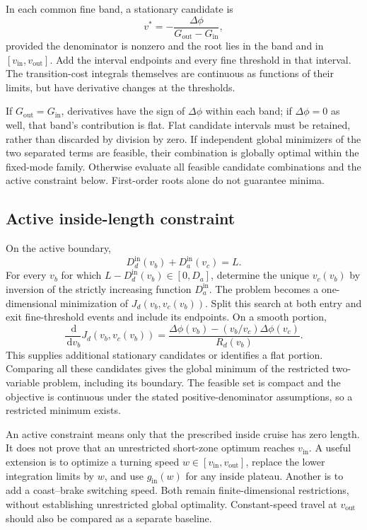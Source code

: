 \documentclass[10pt,a4paper]{article}
\newcommand{\dd}{\,\mathrm{d}}
\newcommand{\out}{\mathrm{out}}
\newcommand{\inn}{\mathrm{in}}
\begin{document}
In each common fine band, a stationary candidate is
\begin{equation}
v^*=-\frac{\Delta\phi}{G_{\out}-G_{\inn}},
\end{equation}
provided the denominator is nonzero and the root lies in the band and in $[v_{\inn},v_{\out}]$. Add the interval endpoints and every fine threshold in that interval. The transition-cost integrals themselves are continuous as functions of their limits, but have derivative changes at the thresholds.

If $G_{\out}=G_{\inn}$, derivatives have the sign of $\Delta\phi$ within each band; if $\Delta\phi=0$ as well, that band's contribution is flat. Flat candidate intervals must be retained, rather than discarded by division by zero. If independent global minimizers of the two separated terms are feasible, their combination is globally optimal within the fixed-mode family. Otherwise evaluate all feasible candidate combinations and the active constraint below. First-order roots alone do not guarantee minima.

\subsection{Active inside-length constraint}
On the active boundary,
\begin{equation}
D_d^{\inn}(v_b)+D_a^{\inn}(v_c)=L.
\end{equation}
For every $v_b$ for which $L-D_d^{\inn}(v_b)\in[0,D_a]$, determine the unique $v_c(v_b)$ by inversion of the strictly increasing function $D_a^{\inn}$. The problem becomes a one-dimensional minimization of $J_d(v_b,v_c(v_b))$. Split this search at both entry and exit fine-threshold events and include its endpoints. On a smooth portion,
\begin{equation}
\frac{\dd}{\dd v_b}J_d(v_b,v_c(v_b))
=\frac{\Delta\phi(v_b)-(v_b/v_c)\Delta\phi(v_c)}{R_d(v_b)}.
\label{eq:activeDerivative}
\end{equation}
This supplies additional stationary candidates or identifies a flat portion. Comparing all these candidates gives the global minimum of the restricted two-variable problem, including its boundary. The feasible set is compact and the objective is continuous under the stated positive-denominator assumptions, so a restricted minimum exists.

An active constraint means only that the prescribed inside cruise has zero length. It does not prove that an unrestricted short-zone optimum reaches $v_{\inn}$. A useful extension is to optimize a turning speed $w\in[v_{\inn},v_{\out}]$, replace the lower integration limits by $w$, and use $g_{\inn}(w)$ for any inside plateau. Another is to add a coast--brake switching speed. Both remain finite-dimensional restrictions, without establishing unrestricted global optimality. Constant-speed travel at $v_{\out}$ should also be compared as a separate baseline.
\end{document}
